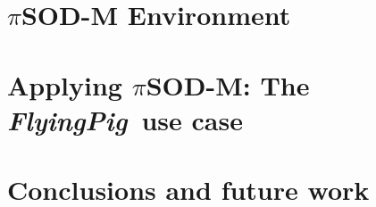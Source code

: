 \documentclass[preprint,12pt]{elsarticle}
\theoremstyle{plain}
\theoremstyle{plain}
\theoremstyle{plain}
\theoremstyle{plain}
\def\FlyingPig{\textsl{FlyingPig}}
\newcommand{\pisodm}[0]{$\pi$SOD-M\xspace}
\begin{document}
\section{\pisodm Environment}\label{sec:implementation}



\section{Applying \pisodm: The \FlyingPig\ use case}
\label{sec:flyingPig}





\section{Conclusions and future work}\label{sec:conclusions}














\end{document}
